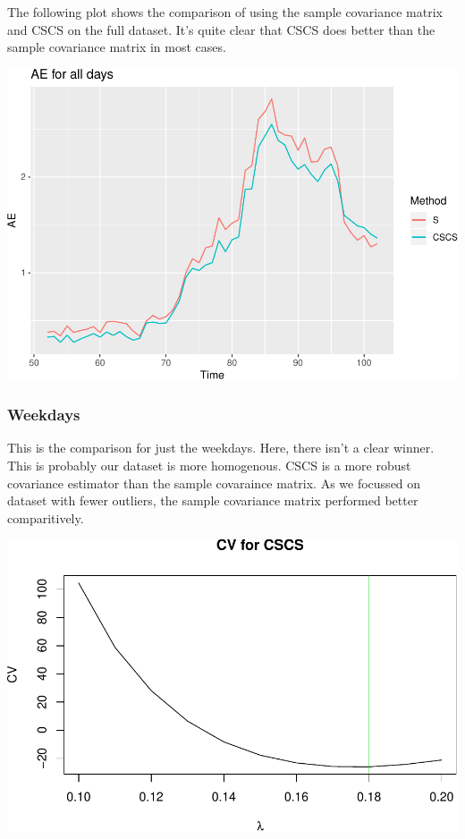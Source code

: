 \documentclass[]{article}
\begin{document}
The following plot shows the comparison of using the sample covariance
matrix and CSCS on the full dataset. It's quite clear that CSCS does
better than the sample covariance matrix in most cases.

\includegraphics{call_center_data_files/figure-latex/comp1-1.pdf}

\subsubsection{Weekdays}\label{weekdays}

This is the comparison for just the weekdays. Here, there isn't a clear
winner. This is probably our dataset is more homogenous. CSCS is a more
robust covariance estimator than the sample covaraince matrix. As we
focussed on dataset with fewer outliers, the sample covariance matrix
performed better comparitively.

\includegraphics{call_center_data_files/figure-latex/unnamed-chunk-1-1.pdf}
\end{document}
